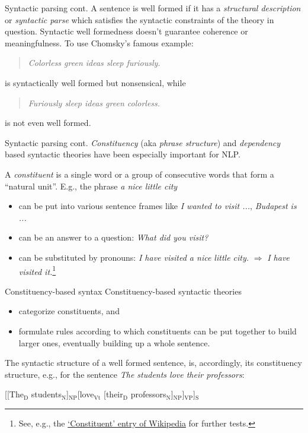 \documentclass[style=upen, size=14pt]{powerdot}
\newcommand{\gold}{\color{arany}}
\begin{document}
\begin{slide}[toc=]{Syntactic parsing cont.}
  A sentence is well formed if it has a \emph{structural description} or
  \emph{syntactic parse} which satisfies the syntactic constraints of the theory in
  question. Syntactic well formedness doesn't guarantee coherence or
  meaningfulness. To use Chomsky's famous example:
  
  \begin{quotation}
    \emph{Colorless green ideas sleep furiously.}
  \end{quotation}
  
  is syntactically well formed but nonsensical, while

  \begin{quotation}
    \emph{Furiously sleep ideas green colorless.}
  \end{quotation}

  is not even well formed.
\end{slide}

\begin{slide}[toc=]{Syntactic parsing cont.}
  \emph{\gold Constituency} (aka \emph{phrase structure}) and \emph{\gold
    dependency} based syntactic theories have been especially important for NLP.\bigskip

  A \emph{\gold constituent} is a single word or a group of consecutive words
  that form a ``natural unit''. E.g., the phrase \emph{a nice little city}
  \begin{itemize}
  \item can be put into various sentence frames like \emph{I wanted to visit
      ...}, \emph{Budapest is ...}
  \item can be an answer to a question: \emph{What did you visit?}
  \item can be substituted by pronouns: \emph{I have visited a nice little
      city.} $\Rightarrow$ \emph{I have visited it.}\footnote{See, e.g., the
      \href{https://en.wikipedia.org/wiki/Constituent_(linguistics)}{`Constituent'
        entry of Wikipedia} for further tests.}
  \end{itemize}
\end{slide}

\begin{slide}[toc=]{Constituency-based syntax}
  Constituency-based syntactic theories
  \begin{itemize}
  \item categorize constituents, and
  \item formulate rules according to which constituents can be put together to
    build larger ones, eventually building up a whole sentence.
  \end{itemize}
  The syntactic structure of a well formed sentence, is, accordingly, its
  constituency structure, e.g., for the sentence \emph{The students love their
    professors}:\bigskip
  
  [[The$_{\mathrm{D}}$ students$_{\mathrm{N}}$]$_\mathrm{NP}$[love$_\mathrm{Vt}$ [their$_{\mathrm{D}}$ professors$_\mathrm{N}$]$_\mathrm{NP}$]$_\mathrm{VP}$]$_\mathrm{S}$
  
\end{slide}
\end{document}
